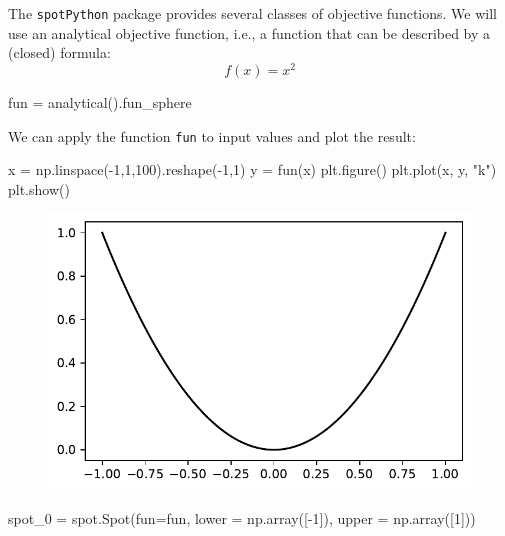 \documentclass[
  letterpaper,
  DIV=11,
  numbers=noendperiod]{scrreprt}
\newenvironment{Shaded}{\begin{snugshade}}{\end{snugshade}}
\newcommand{\DecValTok}[1]{\textcolor[rgb]{0.68,0.00,0.00}{#1}}
\newcommand{\NormalTok}[1]{\textcolor[rgb]{0.00,0.23,0.31}{#1}}
\newcommand{\OperatorTok}[1]{\textcolor[rgb]{0.37,0.37,0.37}{#1}}
\newcommand{\StringTok}[1]{\textcolor[rgb]{0.13,0.47,0.30}{#1}}
\begin{document}
The \texttt{spotPython} package provides several classes of objective
functions. We will use an analytical objective function, i.e., a
function that can be described by a (closed) formula: \[f(x) = x^2\]

\begin{Shaded}
\begin{Highlighting}[]
\NormalTok{fun }\OperatorTok{=}\NormalTok{ analytical().fun\_sphere}
\end{Highlighting}
\end{Shaded}

We can apply the function \texttt{fun} to input values and plot the
result:

\begin{Shaded}
\begin{Highlighting}[]
\NormalTok{x }\OperatorTok{=}\NormalTok{ np.linspace(}\OperatorTok{{-}}\DecValTok{1}\NormalTok{,}\DecValTok{1}\NormalTok{,}\DecValTok{100}\NormalTok{).reshape(}\OperatorTok{{-}}\DecValTok{1}\NormalTok{,}\DecValTok{1}\NormalTok{)}
\NormalTok{y }\OperatorTok{=}\NormalTok{ fun(x)}
\NormalTok{plt.figure()}
\NormalTok{plt.plot(x, y, }\StringTok{"k"}\NormalTok{)}
\NormalTok{plt.show()}
\end{Highlighting}
\end{Shaded}

\begin{figure}[H]

{\centering \includegraphics{007_num_spot_intro_files/figure-pdf/cell-4-output-1.pdf}

}

\end{figure}

\begin{Shaded}
\begin{Highlighting}[]
\NormalTok{spot\_0 }\OperatorTok{=}\NormalTok{ spot.Spot(fun}\OperatorTok{=}\NormalTok{fun,}
\NormalTok{                   lower }\OperatorTok{=}\NormalTok{ np.array([}\OperatorTok{{-}}\DecValTok{1}\NormalTok{]),}
\NormalTok{                   upper }\OperatorTok{=}\NormalTok{ np.array([}\DecValTok{1}\NormalTok{]))}
\end{Highlighting}
\end{Shaded}
\end{document}
